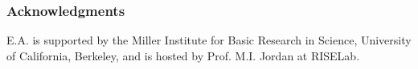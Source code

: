 \documentclass[aoas,preprint]{imsart}
\begin{document}
\tableofcontents















\subsubsection*{Acknowledgments}

E.A. is supported by the Miller Institute for Basic Research in Science,
University of California, Berkeley, and is hosted by Prof. M.I. Jordan
at RISELab.



\end{document}
